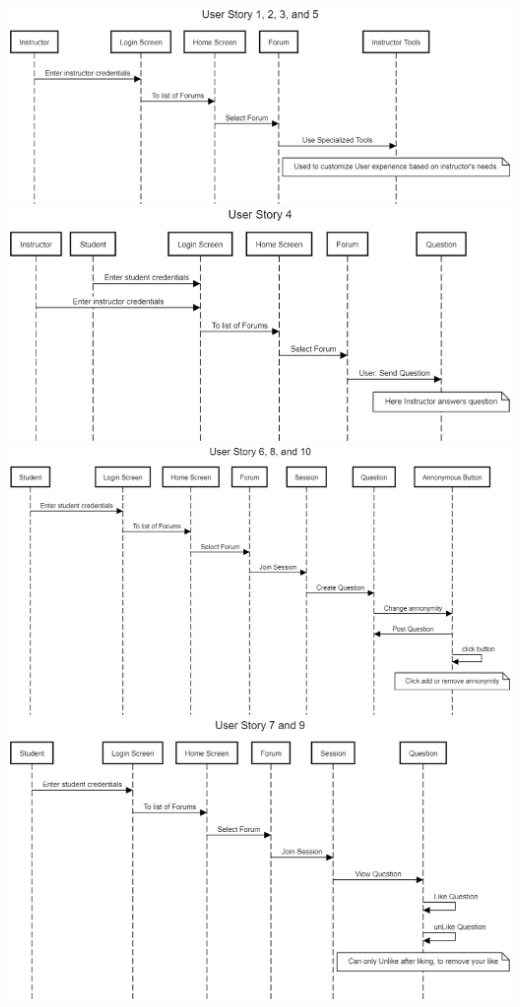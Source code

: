 \documentclass[12pt]{article}
\begin{document}
\begin{flushleft}
\includegraphics[width=\textwidth]{User_Story_1_2_3_and_5.eps}
\includegraphics[width=\textwidth]{User_Story_4_SD.eps}
\includegraphics[width=\textwidth]{User_Story_6_8_and_10_SD.eps}
\includegraphics[width=\textwidth]{User_Story_7_and_9_SD.eps}

\end{flushleft}
\end{document}
